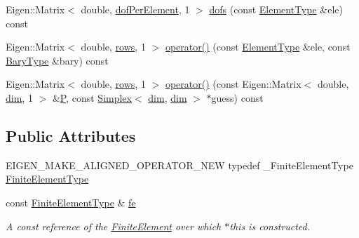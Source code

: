 \begin{DoxyCompactItemize}
\item 
Eigen\+::\+Matrix$<$ double, \hyperlink{classmodel_1_1_trial_function_a2c8f1a6d813250a57c722223f5d1fcab}{dof\+Per\+Element}, 1 $>$ \hyperlink{classmodel_1_1_trial_function_a60bf99b5e600595ec2f25713fb934251}{dofs} (const \hyperlink{classmodel_1_1_trial_function_a72000c5b5030b4738f1d54f149519a78}{Element\+Type} \&ele) const 
\item 
Eigen\+::\+Matrix$<$ double, \hyperlink{classmodel_1_1_trial_function_a1d4b756e358d5dbf7cc9464bc6bb37a8}{rows}, 1 $>$ \hyperlink{classmodel_1_1_trial_function_ac60deffff50e04e50742554e68f1ca9e}{operator()} (const \hyperlink{classmodel_1_1_trial_function_a72000c5b5030b4738f1d54f149519a78}{Element\+Type} \&ele, const \hyperlink{classmodel_1_1_trial_function_af4bd713419cc83660594065c9392bf2c}{Bary\+Type} \&bary) const 
\item 
Eigen\+::\+Matrix$<$ double, \hyperlink{classmodel_1_1_trial_function_a1d4b756e358d5dbf7cc9464bc6bb37a8}{rows}, 1 $>$ \hyperlink{classmodel_1_1_trial_function_a8859212fbdd705529fcb0b5124f8c576}{operator()} (const Eigen\+::\+Matrix$<$ double, \hyperlink{classmodel_1_1_trial_function_a52ad09fcd425a06951e5c917eda26a7f}{dim}, 1 $>$ \&\hyperlink{_f_e_m_2linear__elasticity__3d_2tetgen_2generate_p_o_l_ycube_8m_a50a9afb44201a65ab7ad5feb2150aeb6}{P}, const \hyperlink{classmodel_1_1_simplex}{Simplex}$<$ \hyperlink{classmodel_1_1_trial_function_a52ad09fcd425a06951e5c917eda26a7f}{dim}, \hyperlink{classmodel_1_1_trial_function_a52ad09fcd425a06951e5c917eda26a7f}{dim} $>$ $\ast$guess) const 
\end{DoxyCompactItemize}
\subsection*{Public Attributes}
\begin{DoxyCompactItemize}
\item 
E\+I\+G\+E\+N\+\_\+\+M\+A\+K\+E\+\_\+\+A\+L\+I\+G\+N\+E\+D\+\_\+\+O\+P\+E\+R\+A\+T\+O\+R\+\_\+\+N\+E\+W typedef \+\_\+\+Finite\+Element\+Type \hyperlink{classmodel_1_1_trial_function_affdabe3315d0208c9b2210c3cbee6d42}{Finite\+Element\+Type}
\item 
const \hyperlink{classmodel_1_1_trial_function_affdabe3315d0208c9b2210c3cbee6d42}{Finite\+Element\+Type} \& \hyperlink{classmodel_1_1_trial_function_a808f99f04cba2e6c93d030771538861d}{fe}
\begin{DoxyCompactList}\small\item\em A const reference of the \hyperlink{classmodel_1_1_finite_element}{Finite\+Element} over which $\ast$this is constructed. \end{DoxyCompactList}\end{DoxyCompactItemize}
